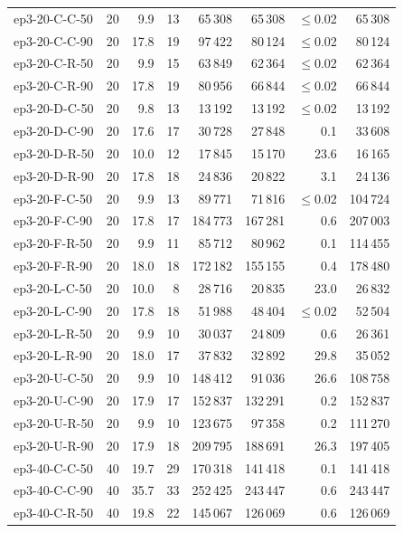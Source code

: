 \begin{longtable}{lrrrrrrr}
  ep3-20-C-C-50 & 20 & 9.9 & 13 & 65\,308 & 65\,308 & $\le$0.02 & 65\,308 \\
  ep3-20-C-C-90 & 20 & 17.8 & 19 & 97\,422 & 80\,124 & $\le$0.02 & 80\,124 \\
  ep3-20-C-R-50 & 20 & 9.9 & 15 & 63\,849 & 62\,364 & $\le$0.02 & 62\,364 \\
  ep3-20-C-R-90 & 20 & 17.8 & 19 & 80\,956 & 66\,844 & $\le$0.02 & 66\,844 \\
  ep3-20-D-C-50 & 20 & 9.8 & 13 & 13\,192 & 13\,192 & $\le$0.02 & 13\,192 \\
  ep3-20-D-C-90 & 20 & 17.6 & 17 & 30\,728 & 27\,848 & 0.1 & 33\,608 \\
  ep3-20-D-R-50 & 20 & 10.0 & 12 & 17\,845 & 15\,170 & 23.6 & 16\,165 \\
  ep3-20-D-R-90 & 20 & 17.8 & 18 & 24\,836 & 20\,822 & 3.1 & 24\,136 \\
  ep3-20-F-C-50 & 20 & 9.9 & 13 & 89\,771 & 71\,816 & $\le$0.02 & 104\,724 \\
  ep3-20-F-C-90 & 20 & 17.8 & 17 & 184\,773 & 167\,281 & 0.6 & 207\,003 \\
  ep3-20-F-R-50 & 20 & 9.9 & 11 & 85\,712 & 80\,962 & 0.1 & 114\,455 \\
  ep3-20-F-R-90 & 20 & 18.0 & 18 & 172\,182 & 155\,155 & 0.4 & 178\,480 \\
  ep3-20-L-C-50 & 20 & 10.0 & 8 & 28\,716 & 20\,835 & 23.0 & 26\,832 \\
  ep3-20-L-C-90 & 20 & 17.8 & 18 & 51\,988 & 48\,404 & $\le$0.02 & 52\,504 \\
  ep3-20-L-R-50 & 20 & 9.9 & 10 & 30\,037 & 24\,809 & 0.6 & 26\,361 \\
  ep3-20-L-R-90 & 20 & 18.0 & 17 & 37\,832 & 32\,892 & 29.8 & 35\,052 \\
  ep3-20-U-C-50 & 20 & 9.9 & 10 & 148\,412 & 91\,036 & 26.6 & 108\,758 \\
  ep3-20-U-C-90 & 20 & 17.9 & 17 & 152\,837 & 132\,291 & 0.2 & 152\,837 \\
  ep3-20-U-R-50 & 20 & 9.9 & 10 & 123\,675 & 97\,358 & 0.2 & 111\,270 \\
  ep3-20-U-R-90 & 20 & 17.9 & 18 & 209\,795 & 188\,691 & 26.3 & 197\,405 \\
  \addlinespace
  ep3-40-C-C-50 & 40 & 19.7 & 29 & 170\,318 & 141\,418 & 0.1 & 141\,418 \\
  ep3-40-C-C-90 & 40 & 35.7 & 33 & 252\,425 & 243\,447 & 0.6 & 243\,447 \\
  ep3-40-C-R-50 & 40 & 19.8 & 22 & 145\,067 & 126\,069 & 0.6 & 126\,069 \\

\end{longtable}
